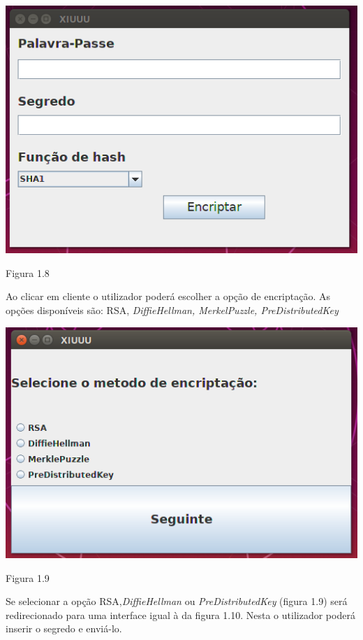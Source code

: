 \newline\begin{center}\includegraphics[scale=0.5]{img/PBKDF2.png}\newline\caption{Figura 1.8}\end{center}
Ao clicar em cliente o utilizador poderá escolher a opção de encriptação. As opções disponíveis são: RSA, \textit{DiffieHellman, MerkelPuzzle, PreDistributedKey}
\newline\begin{center}\includegraphics[scale=0.5]{img/encryptMethod.png}\newline\caption{Figura 1.9}\end{center}
Se selecionar a opção RSA,\textit{DiffieHellman} ou \textit{PreDistributedKey} (figura 1.9) será redirecionado para uma interface igual à da figura 1.10. Nesta o utilizador poderá inserir o segredo e enviá-lo. 
